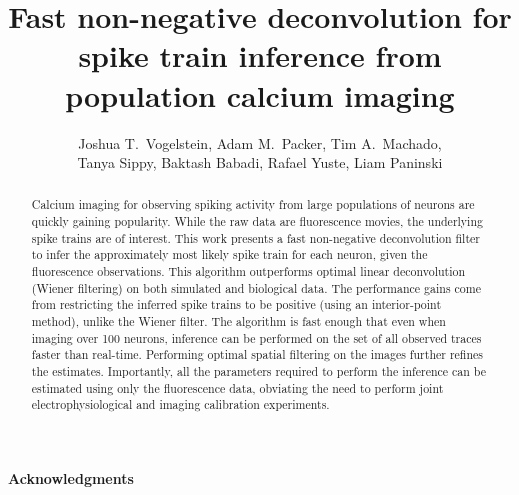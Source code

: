  
\usepackage{multicol}
\usepackage{hyperref}
\usepackage{algorithmic}
\usepackage{algorithm}
\newcommand{\zzz}{z}
\newcommand{\az}{\argmax_{\bM \bC \geq \ve{0}}}
\newcommand{\anx}{\argmax_{n_t \in \mathbb{N}_0 \forall t}}
\newcommand{\foopsi}{fast }


\title{Fast non-negative deconvolution for spike train inference from population calcium imaging}

\author{Joshua T.~Vogelstein, Adam M.~Packer, Tim A.~Machado, \\ Tanya Sippy, Baktash Babadi, Rafael Yuste, Liam Paninski}



\maketitle
\begin{abstract}
Calcium imaging for observing spiking activity from large populations of neurons are quickly gaining popularity.  While the raw data are fluorescence movies, the underlying spike trains are of interest.  This work presents a fast non-negative deconvolution filter to infer the approximately most likely spike train for each neuron, given the fluorescence observations. This algorithm outperforms optimal linear deconvolution (Wiener filtering) on both simulated and biological data. The performance gains come from restricting the inferred spike trains to be positive (using an interior-point method), unlike the Wiener filter.  The algorithm is fast enough that even when imaging over 100 neurons, inference can be performed on the set of all observed traces faster than real-time.  Performing optimal spatial filtering on the images further refines the estimates.  Importantly, all the parameters required to perform the inference can be estimated using only the fluorescence data, obviating the need to perform joint electrophysiological and imaging calibration experiments.
\end{abstract}



\paragraph{Acknowledgments}

